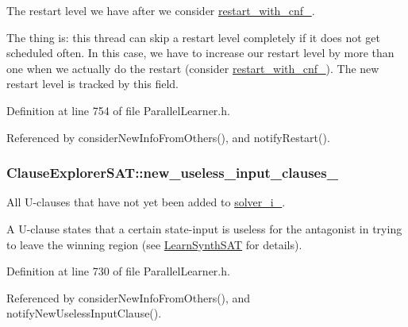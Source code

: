 The restart level we have after we consider \hyperlink{classClauseExplorerSAT_a1a9dc7f76967c8164e9625df34dec172}{restart\-\_\-with\-\_\-cnf\-\_\-}. 

The thing is\-: this thread can skip a restart level completely if it does not get scheduled often. In this case, we have to increase our restart level by more than one when we actually do the restart (consider \hyperlink{classClauseExplorerSAT_a1a9dc7f76967c8164e9625df34dec172}{restart\-\_\-with\-\_\-cnf\-\_\-}). The new restart level is tracked by this field. 

Definition at line 754 of file Parallel\-Learner.\-h.



Referenced by consider\-New\-Info\-From\-Others(), and notify\-Restart().

\hypertarget{classClauseExplorerSAT_a3d1bdb9a6484c85af655a4eed1ee5f19}{
\subsubsection[{new\-\_\-useless\-\_\-input\-\_\-clauses\-\_\-}]{ Clause\-Explorer\-S\-A\-T\-::new\-\_\-useless\-\_\-input\-\_\-clauses\-\_\-\hspace{0.3cm}{\ttfamily [protected]}}}\label{classClauseExplorerSAT_a3d1bdb9a6484c85af655a4eed1ee5f19}


All U-\/clauses that have not yet been added to \hyperlink{classClauseExplorerSAT_a65b5b3d04ff5be8bfec60d3dcf86e4d0}{solver\-\_\-i\-\_\-}. 

A U-\/clause states that a certain state-\/input is useless for the antagonist in trying to leave the winning region (see \hyperlink{classLearnSynthSAT}{Learn\-Synth\-S\-A\-T} for details). 

Definition at line 730 of file Parallel\-Learner.\-h.



Referenced by consider\-New\-Info\-From\-Others(), and notify\-New\-Useless\-Input\-Clause().

